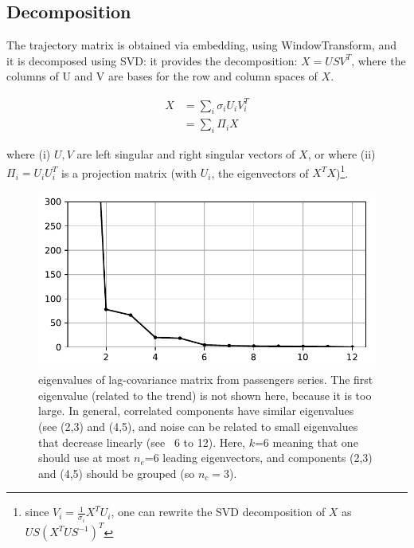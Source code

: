 \documentclass{article}
\begin{document}

\subsection{Decomposition}

The trajectory matrix is obtained via embedding, using {\selectfont WindowTransform}, and it is decomposed using SVD: it provides the decomposition: $X=USV^T$, where the  columns of U and V are bases for the row and column spaces of $X$.

\begin{align}
X &= \sum_i\sigma_iU_iV_i^T\nonumber \\
  &= \sum_i \Pi_i X\nonumber
\end{align}

where (i) $U,V$ are left singular and right singular vectors of $X$, or where (ii) $\Pi_i=U_i U_i^T$ is a projection matrix (with $U_i$, the eigenvectors of $X^TX$)\footnote{since $V_i=\frac{1}{\sigma_i} X^TU_i$, one can rewrite the SVD decomposition of $X$ as $US(X^TUS^{-1})^T$}.\\


\begin{figure}
  \centering
  \includegraphics[scale=0.5]{figures/fig0}
  \caption{eigenvalues of lag-covariance matrix from passengers series. The first eigenvalue (related to the trend) is not shown here, because it is too large. In general, correlated components have similar eigenvalues (see (2,3) and (4,5), and noise can be related to small eigenvalues that decrease linearly (see ~6 to 12). Here, $k$=6 meaning that one should use at most $n_e$=6 leading eigenvectors, and components (2,3) and (4,5) should be grouped (so $n_c=3$).}
  \label{fig:f0}
\end{figure}
\end{document}
